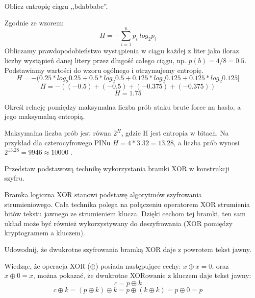 \documentclass[answers,11pt]{exam}
\begin{document}
\begin{questions}
\question Oblicz entropię ciągu ,,bdabbabc''.
\begin{solution}
Zgodnie ze wzorem:
\begin{equation}
H = - \sum_{i=1}^n p_i \ log_2 p_i
\end{equation}
Obliczamy prawdopodobieństwo wystąpienia w ciągu każdej z liter jako iloraz liczby wystąpień danej litery przez długość całego ciągu, np. $ p(b) = 4/8 = 0.5 $. Podstawiamy wartości do wzoru ogólnego i otrzymujemy entropię.
\begin{equation}
H = - ( 0.25 * log_2 0.25 + 0.5 * log_2 0.5 + 0.125 * log_2 0.125 + 0.125 * log_2 0.125 ]
\end{equation}
\begin{equation}
H = -((-0.5)+(-0.5)+(-0.375)+(-0.375))
\end{equation}
\begin{equation}
H = 1.75
\end{equation}
\end{solution}

\question Określ relację pomiędzy maksymalna liczba prób ataku brute force na hasło, a jego maksymalną entropią.
\begin{solution}
Maksymalna liczba prób jest równa $2^H$, gdzie H jest entropia w bitach. Na przykład dla czterocyfrowego PINu $H = 4*3.32 = 13.28 $, a liczba prób wynosi $ 2^{13.28} = 9946 \approx 10000$ .
\end{solution}

\question Przedstaw podstawową technikę wykorzystania bramki XOR w konstrukcji szyfru.
\begin{solution}
Bramka logiczna XOR stanowi podstawę algorytmów szyfrowania strumieniowego. Cała technika polega na połączeniu operatorem XOR strumienia bitów tekstu jawnego ze strumieniem klucza. Dzięki cechom tej bramki, ten sam układ może być również wykorzystywany do deszyfrowania (XOR pomiędzy kryptogramem a kluczem). 
\end{solution}

\question Udowodnij, że dwukrotne szyfrowania bramką XOR daje z powrotem tekst jawny.
\begin{solution}
Wiedząc, że operacja XOR ($\oplus$) posiada następujące cechy: $x \oplus x = 0$, oraz $x \oplus 0 = x$, można pokazać, że dwukrotne XORowanie z kluczem daje tekst jawny:
\begin{equation}
c = p \oplus k 
\end{equation}
\begin{equation}
c \oplus k = (p \oplus k) \oplus k = p \oplus (k \oplus k ) = p \oplus 0 = p 
\end{equation}
\end{solution}


\end{questions}
\end{document}
